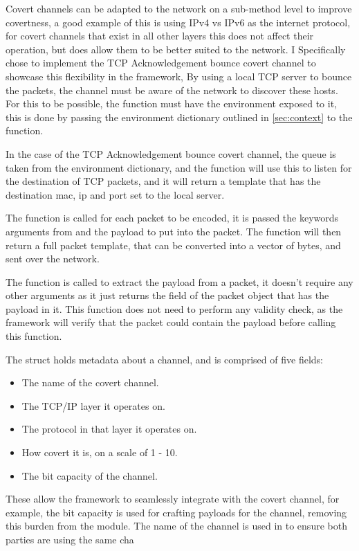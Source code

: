 Covert channels can be adapted to the network on a sub-method level to improve covertness, a good example of this is using IPv4 vs IPv6 as the internet protocol, for covert channels that exist in all other layers this does not affect their operation, but does allow them to be better suited to the network. I Specifically chose to implement the TCP Acknowledgement bounce covert channel to showcase this flexibility in the framework, By using a local TCP server to bounce the packets, the channel must be aware of the network to discover these hosts. For this to be possible, the  function must have the environment exposed to it, this is done by passing the environment dictionary outlined in \ref{sec:context} to the  function.

In the case of the TCP Acknowledgement bounce covert channel, the queue is taken from the environment dictionary, and the  function will use this to listen for the destination of TCP packets, and it will return a template that has the destination mac, ip and port set to the local server.

The  function is called for each packet to be encoded, it is passed the keywords arguments from  and the payload to put into the packet. The function will then return a full packet template, that can be converted into a vector of bytes, and sent over the network.

The  function is called to extract the payload from a packet, it doesn't require any other arguments as it just returns the field of the packet object that has the payload in it. This function does not need to perform any validity check, as the framework will verify that the packet could contain the payload before calling this function.

The  struct holds metadata about a channel, and is comprised of five fields:
\begin{itemize}
    \item The name of the covert channel.
    \item The TCP/IP layer it operates on.
    \item The protocol in that layer it operates on.
    \item How covert it is, on a scale of 1 - 10.
    \item The bit capacity of the channel.
\end{itemize}
\label{itm:covert_method}

These allow the framework to seamlessly integrate with the covert channel, for example, the bit capacity is used for crafting payloads for the channel, removing this burden from the module. The name of the channel is used in  to ensure both parties are using the same cha

